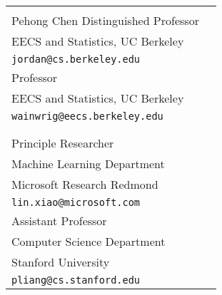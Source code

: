 \documentclass[11pt]{res} %
\begin{document}
{\begin{resume}
\begin{tabular}{ll}
\begin{minipage}{0.5\textwidth}
{\bf Michael I. Jordan}\\
Pehong Chen Distinguished Professor\\
EECS and Statistics, UC Berkeley\\
{\tt jordan@cs.berkeley.edu}
\end{minipage}&
\begin{minipage}{0.5\textwidth}
{\bf Martin J. Wainwright}\\
Professor\\
EECS and Statistics, UC Berkeley\\
{\tt wainwrig@eecs.berkeley.edu}
\end{minipage}\\\\
\begin{minipage}{0.5\textwidth}
{\bf Lin Xiao}\\
Principle Researcher\\
Machine Learning Department\\
Microsoft Research Redmond\\
{\tt lin.xiao@microsoft.com}
\end{minipage}&
\begin{minipage}{0.5\textwidth}
{\bf Percy Liang}\\
Assistant Professor\\
Computer Science Department\\
Stanford University\\
{\tt pliang@cs.stanford.edu}
\end{minipage}
\end{tabular}




\end{resume}
}
\end{document}

